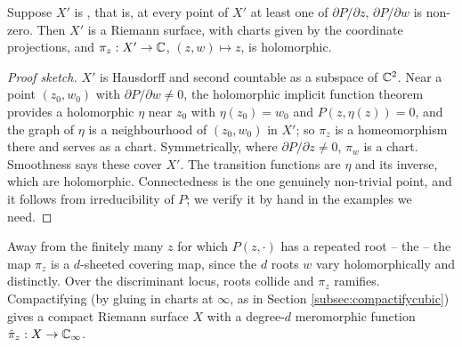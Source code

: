 \documentclass[a4paper]{scrartcl}
\newcommand{\Cinf}{\C_\infty}
\begin{document}
\begin{proposition}\label{prop:algebraicsurface}
	Suppose $X'$ is , that is, at every point of $X'$ at least one of
	$\partial P/\partial z$, $\partial P /\partial w$ is non-zero. Then $X'$ is a Riemann
	surface, with charts given by the coordinate projections, and
	$\pi_z : X' \to \mathbb{C}$, $(z,w)\mapsto z$, is holomorphic.
\end{proposition}

\begin{proof}[Proof sketch]
	$X'$ is Hausdorff and second countable as a subspace of $\mathbb{C}^2$. Near a point
	$(z_0,w_0)$ with $\partial P/\partial w \neq 0$, the holomorphic implicit function
	theorem provides a holomorphic $\eta$ near $z_0$ with $\eta(z_0)=w_0$ and
	$P(z,\eta(z))=0$, and the graph of $\eta$ is a neighbourhood of $(z_0,w_0)$ in $X'$; so
	$\pi_z$ is a homeomorphism there and serves as a chart. Symmetrically, where
	$\partial P/\partial z \neq 0$, $\pi_w$ is a chart. Smoothness says these cover $X'$.
	The transition functions are $\eta$ and its inverse, which are holomorphic. Connectedness
	is the one genuinely non-trivial point, and it follows from irreducibility of $P$; we
	verify it by hand in the examples we need.
\end{proof}

Away from the finitely many $z$ for which $P(z,\cdot)$ has a repeated root -- the
 -- the map $\pi_z$ is a $d$-sheeted covering map, since the $d$
roots $w$ vary holomorphically and distinctly. Over the discriminant locus, roots collide
and $\pi_z$ ramifies. Compactifying (by gluing in charts at $\infty$, as in Section
\ref{subsec:compactifycubic}) gives a compact Riemann surface $X$ with a degree-$d$
meromorphic function $\hat\pi_z : X \to \Cinf$.
\end{document}
